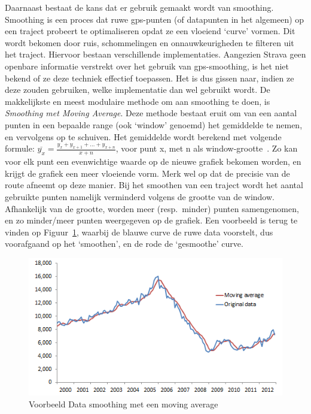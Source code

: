 Daarnaast bestaat de kans dat er gebruik gemaakt wordt van smoothing. Smoothing
is een proces dat ruwe \ac{gps}-punten (of datapunten in het algemeen) op een
traject probeert te optimaliseren opdat ze een vloeiend `curve' vormen. Dit
wordt bekomen door ruis, schommelingen en onnauwkeurigheden te filteren uit het
traject. Hiervoor bestaan verschillende implementaties. Aangezien Strava geen
openbare informatie verstrekt over het gebruik van gps-smoothing, is het niet
bekend of ze deze techniek effectief toepassen. Het is dus gissen naar, indien
ze deze zouden gebruiken, welke implementatie dan wel gebruikt wordt. De
makkelijkste en meest modulaire methode om aan smoothing te doen, is
\textit{Smoothing met Moving Average}. Deze methode bestaat eruit om van een
aantal punten in een bepaalde range (ook `window' genoemd) het gemiddelde te
nemen, en vervolgens op te schuiven. Het gemiddelde wordt berekend met volgende
formule: $\overline{y_x} = \frac{y_x + y_{x+1} + \ldots + y_{x+n}}{x+n}$, voor
punt x, met n als window-grootte~\cite{Smoothin16:online,
    SmoothingandInterpolatingNoisyGPSDatawithSmoothingSplines, Smoothin86:online}.
Zo kan voor elk punt een evenwichtige waarde op de nieuwe grafiek bekomen
worden, en krijgt de grafiek een meer vloeiende vorm. Merk wel op dat de
precisie van de route afneemt op deze manier. Bij het smoothen van een traject
wordt het aantal gebruikte punten namelijk verminderd volgens de grootte van de
window. Afhankelijk van de grootte, worden meer (resp.\ minder) punten
samengenomen, en zo minder/meer punten weergegeven op de grafiek. Een voorbeeld
is terug te vinden op Figuur~\ref{fig:SmoothingExample}, waarbij de blauwe
curve de ruwe data voorstelt, dus voorafgaand op het `smoothen', en de rode de
`gesmoothe' curve.
\begin{figure}[h]
    \centering
    \includegraphics[width=0.6\linewidth]{fig/SmoothingExample.png}
    \caption{Voorbeeld Data smoothing met een moving average~\cite{SmoothingandInterpolatingNoisyGPSDatawithSmoothingSplines}}\label{fig:SmoothingExample}
\end{figure}

